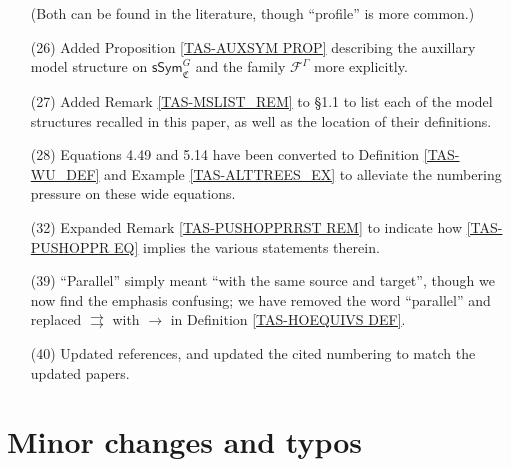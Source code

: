 \documentclass[a4paper,10pt
]{article}%
\numberwithin{equation}{section}
\numberwithin{figure}{section}
\theoremstyle{definition} %
\newcommand{\1}{\ensuremath{\mathbbm 1}}%
\begin{document}
\begin{enumerate}
        (Both can be found in the literature, though ``profile'' is more common.)
\item[(26)] Added Proposition \ref{TAS-AUXSYM PROP} describing the auxillary model structure on $\mathsf{sSym}^G_{\mathfrak C}$ and the family $\mathcal F^\Gamma$ more explicitly.
\item[(27)] Added Remark \ref{TAS-MSLIST_REM} to \S 1.1 to list each of the model structures recalled in this paper, as well as the location of their definitions.
\item[(28)] Equations 4.49 and 5.14 have been converted to Definition \ref{TAS-WU_DEF} and Example \ref{TAS-ALTTREES_EX} to alleviate the numbering pressure on these wide equations.
\item[(32)] Expanded Remark \ref{TAS-PUSHOPPRRST REM} to indicate how \eqref{TAS-PUSHOPPR EQ} implies the various statements therein.
\item[(39)] ``Parallel'' simply meant ``with the same source and target'', though we now find the emphasis confusing; we have removed the word ``parallel'' and replaced $\rightrightarrows$ with $\to$ in Definition \ref{TAS-HOEQUIVS DEF}.         
\item[(40)] Updated references, and updated the cited numbering to match the updated papers.
\end{enumerate}



\section{Minor changes and typos}
 
\end{document}
